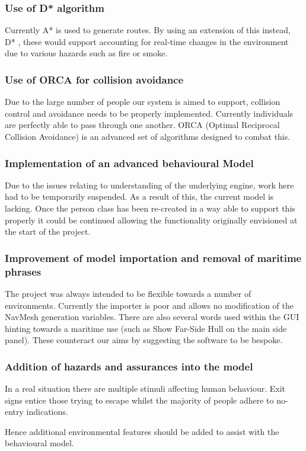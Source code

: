 \subsubsection{Use of D{*} algorithm}

Currently A{*} is used to generate routes. By using an extension of this instead, D{*} \cite{Dstar}, these would support accounting for real-time changes in the environment due to various hazards such as fire or smoke.


\subsubsection{Use of ORCA for collision avoidance}
\label{Problems:subsubsec:ORCA}

Due to the large number of people our system is aimed to support, collision
control and avoidance needs to be properly implemented. Currently
individuals are perfectly able to pass through one another. ORCA (Optimal
Reciprocal Collision Avoidance) \cite{ORCA} is an advanced set of algorithms designed
to combat this.


\subsubsection{Implementation of an advanced behavioural Model}

Due to the issues relating to understanding of the underlying engine,
work here had to be temporarily suspended. As a result of this, the
current model is lacking. Once the person class has been
re-created in a way able to support this properly it could be continued
allowing the functionality originally envisioned at the start of the
project.


\subsubsection{Improvement of model importation and removal of maritime phrases}

The project was always intended to be flexible towards a number of
environments. Currently the importer is poor and allows no modification
of the NavMesh generation variables. There are also several words
used within the GUI hinting towards a maritime use (such as Show Far-Side
Hull on the main side panel). These counteract our aims by suggesting
the software to be bespoke.


\subsubsection{Addition of hazards and assurances into the model}

In a real situation there are multiple stimuli affecting human behaviour.
Exit signs entice those trying to escape whilst the majority of people
adhere to no-entry indications.

Hence additional environmental features should be added to assist
with the behavioural model.



